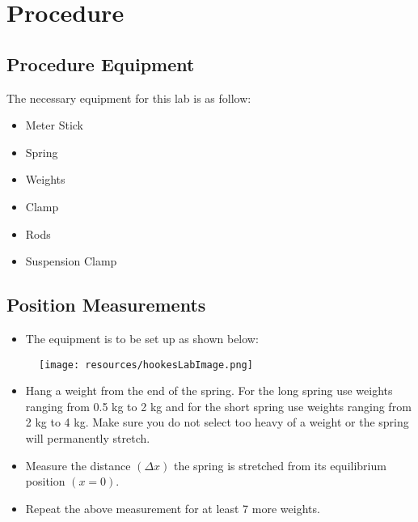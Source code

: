 \begingroup
\let\clearpage\relax\chapter{Procedure}

\section{Procedure Equipment}

The necessary equipment for this lab is as follow: 
\begin{itemize}
  \item Meter Stick
  \item Spring
  \item Weights 
  \item Clamp
  \item Rods
  \item Suspension Clamp
\end{itemize}

\section{Position Measurements}

\begin{itemize}
  \item The equipment is to be set up as shown below:
\end{itemize}

\begin{figure}[h!]
  \centerline{\texttt{[image: resources/hookesLabImage.png]}}
\end{figure}

\begin{itemize}
  \item Hang a weight from the end of the spring. For the long spring use weights ranging
        from 0.5 kg to 2 kg and for the short spring use weights ranging from 2 kg to 4 
        kg. Make sure you do not select too heavy of a weight or the spring will 
        permanently stretch.
  \item Measure the distance $(\Delta x)$ the spring is stretched from its equilibrium
        position $(x = 0)$.
  \item Repeat the above measurement for at least 7 more weights.
\end{itemize}
